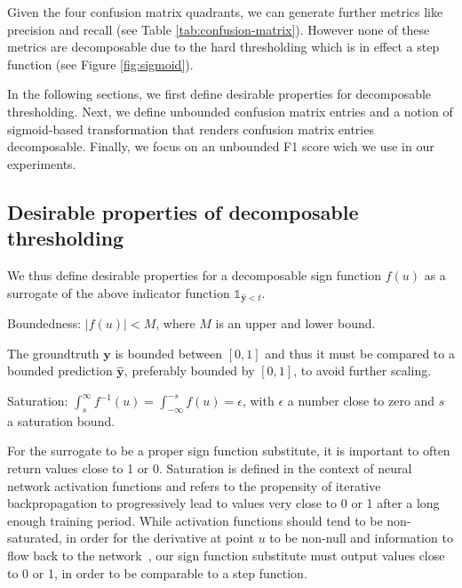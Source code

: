

Given the four confusion matrix quadrants, we can generate further metrics like precision and recall (see Table \ref{tab:confusion-matrix}). However none of these metrics are decomposable due to the hard thresholding which is in effect a step function (see Figure \ref{fig:sigmoid}).

In the following sections, we first define desirable properties for decomposable thresholding.
Next, we define unbounded confusion matrix entries and a notion of sigmoid-based transformation that renders confusion matrix entries decomposable. Finally, we focus on an unbounded F1 score wich we use in our experiments.

\subsection{Desirable properties of decomposable thresholding}
\label{subsection:properties}

We thus define desirable properties for a decomposable sign function $f(u)$ as a surrogate of the above indicator function \(\mathds{1}_{\hat{\mathbf{y}} < t}\).

\begin{property}
  Boundedness: $|f(u)| < M$, where $M$ is an upper and lower bound.
\end{property}
The groundtruth $\mathbf{y}$ is bounded between $[0,1]$ and thus it must be compared to a bounded prediction $\mathbf{\hat{y}}$, preferably bounded by $[0,1]$, to avoid further scaling.

\begin{property}
  Saturation: $\int_{s}^{\infty} f^{-1}(u) = \int_{-\infty}^{-s} f(u) = \epsilon$, with $\epsilon$ a number close to zero and $s$ a saturation bound.
\end{property}
For the surrogate to be a proper sign function substitute, it is important to often return values close to 1 or 0. Saturation is defined in the context of neural network activation functions and refers to the propensity of iterative backpropagation to progressively lead to values very close to 0 or 1 after a long enough training period. While activation functions should tend to be non-saturated, in order for the derivative at point $u$ to be non-null and information to flow back to the network~\cite{saturation}, our sign function substitute must output values close to 0 or 1, in order to be comparable to a step function.

